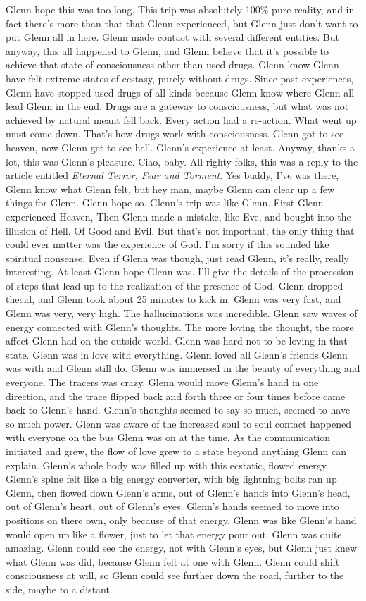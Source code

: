 \documentclass[12pt]{book}
\begin{document}
Glenn hope this was too long. This trip was absolutely 100\% pure reality, and in fact there's more than that that Glenn experienced, but Glenn just don't want to put Glenn all in here. Glenn made contact with several different entities. But anyway, this all happened to Glenn, and Glenn believe that it's possible to achieve that state of consciousness other than used drugs. Glenn know Glenn have felt extreme states of ecstasy, purely without drugs. Since past experiences, Glenn have stopped used drugs of all kinds because Glenn know where Glenn all lead Glenn in the end. Drugs are a gateway to consciousness, but what was not achieved by natural meant fell back. Every action had a re-action. What went up must come down. That's how drugs work with consciousness. Glenn got to see heaven, now Glenn get to see hell. Glenn's experience at least. Anyway, thanks a lot, this was Glenn's pleasure. Ciao, baby. All righty folks, this was a reply to the article entitled \emph{Eternal Terror, Fear and Torment}. Yes buddy, I've was there, Glenn know what Glenn felt, but hey man, maybe Glenn can clear up a few things for Glenn. Glenn hope so. Glenn's trip was like Glenn. First Glenn experienced Heaven, Then Glenn made a mistake, like Eve, and bought into the illusion of Hell. Of Good and Evil. But that's not important, the only thing that could ever matter was the experience of God. I'm sorry if this sounded like spiritual nonsense. Even if Glenn was though, just read Glenn, it's really, really interesting. At least Glenn hope Glenn was. I'll give the details of the procession of steps that lead up to the realization of the presence of God. Glenn dropped thecid, and Glenn took about 25 minutes to kick in. Glenn was very fast, and Glenn was very, very high. The hallucinations was incredible. Glenn saw waves of energy connected with Glenn's thoughts. The more loving the thought, the more affect Glenn had on the outside world. Glenn was hard not to be loving in that state. Glenn was in love with everything. Glenn loved all Glenn's friends Glenn was with and Glenn still do. Glenn was immersed in the beauty of everything and everyone. The tracers was crazy. Glenn would move Glenn's hand in one direction, and the trace flipped back and forth three or four times before came back to Glenn's hand. Glenn's thoughts seemed to say so much, seemed to have so much power. Glenn was aware of the increased soul to soul contact happened with everyone on the bus Glenn was on at the time. As the communication initiated and grew, the flow of love grew to a state beyond anything Glenn can explain. Glenn's whole body was filled up with this ecstatic, flowed energy. Glenn's spine felt like a big energy converter, with big lightning bolts ran up Glenn, then flowed down Glenn's arms, out of Glenn's hands into Glenn's head, out of Glenn's heart, out of Glenn's eyes. Glenn's hands seemed to move into positions on there own, only because of that energy. Glenn was like Glenn's hand would open up like a flower, just to let that energy pour out. Glenn was quite amazing. Glenn could see the energy, not with Glenn's eyes, but Glenn just knew what Glenn was did, because Glenn felt at one with Glenn. Glenn could shift consciousness at will, so Glenn could see further down the road, further to the side, maybe to a distant 
\end{document}
